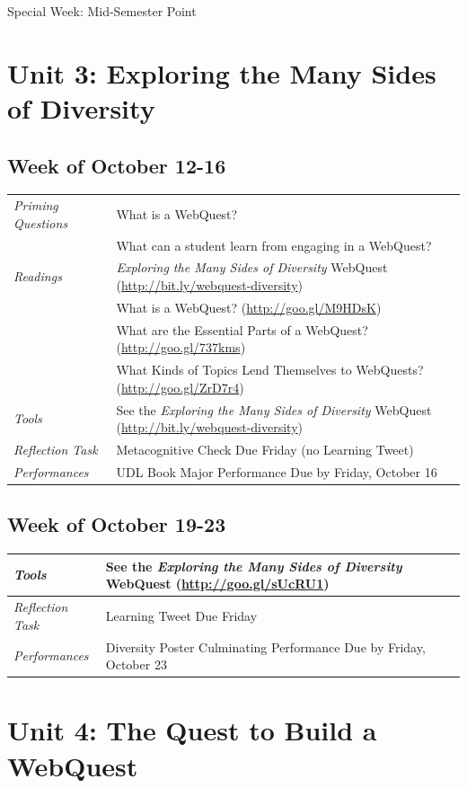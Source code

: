 \documentclass{tufte-handout}
\newcommand{\tabpq}{\faQuestionCircle\medspace\textit{Priming Questions}}
\newcommand{\tabread}{\faBook\medspace\textit{Readings}}
\newcommand{\tabperformance}{\faTasks\medspace\textit{Performances}}
\newcommand{\tabtools}{\faWrench\medspace\textit{Tools}}
\newcommand{\tabtweet}{\faLightbulbO\medspace\textit{Reflection Task} & Learning Tweet Due Friday \\}
\newcommand{\tabcheck}{\faLightbulbO\medspace\textit{Reflection Task} & Metacognitive Check Due Friday (no Learning Tweet) \\}
\newenvironment{tabsched}
	{\small
	\begin{tabular}{p{1.5in}p{4.5in}}
	\toprule}
	{\bottomrule
	\end{tabular}
	\normalsize}
\newenvironment{specweek}
	{\begin{center}
		\fontseries{b} \faBullhorn \medspace Special Week: }
		{\medspace \faBullhorn \fontseries{m}
	\end{center}}
\newcommand{\weeknine}{October 12-16}
\newcommand{\weekten}{October 19-23}
\newcommand{\midsemester}{Mid-Semester Point}
\begin{document}
\begin{specweek}\midsemester\end{specweek}

\section{Unit 3: Exploring the Many Sides of Diversity}

\subsection{Week of \weeknine}

\begin{tabsched}
	\tabpq & What is a WebQuest? \\
	& What can a student learn from engaging in a WebQuest? \\
	\midrule
	\tabread & \textit{Exploring the Many Sides of Diversity} WebQuest (\url{http://bit.ly/webquest-diversity})\\
	&  What is a WebQuest? (\url{http://goo.gl/M9HDsK}) \\
	& What are the Essential Parts of a WebQuest? (\url{http://goo.gl/737kms}) \\
	& What Kinds of Topics Lend Themselves to WebQuests? (\url{http://goo.gl/ZrD7r4}) \\
	\midrule
	\tabtools & See the \textit{Exploring the Many Sides of Diversity} WebQuest (\url{http://bit.ly/webquest-diversity}) \\
	\midrule
	\tabcheck
	\midrule
	\tabperformance & UDL Book Major Performance Due by Friday, October 16 \\
\end{tabsched}

\subsection{Week of \weekten}

\begin{tabsched}
	\tabtools & See the \textit{Exploring the Many Sides of Diversity} WebQuest (\url{http://goo.gl/sUcRU1}) \\
	\midrule
	\tabtweet
	\midrule
	\tabperformance & Diversity Poster Culminating Performance Due by Friday, October 23 \\
\end{tabsched}

\section{Unit 4: The Quest to Build a WebQuest}
\end{document}
